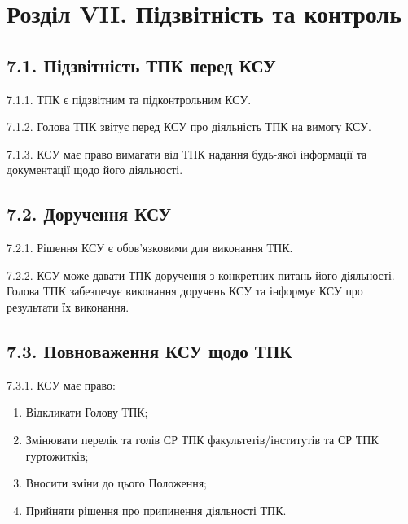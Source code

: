 \section*{Розділ VII. Підзвітність та контроль}

\subsection*{7.1. Підзвітність ТПК перед КСУ}
    7.1.1. ТПК є підзвітним та підконтрольним КСУ.

    7.1.2. Голова ТПК звітує перед КСУ про діяльність ТПК на вимогу КСУ.

    7.1.3. КСУ має право вимагати від ТПК надання будь-якої інформації та документації щодо його діяльності.

\subsection*{7.2. Доручення КСУ}
    7.2.1. Рішення КСУ є обов'язковими для виконання ТПК.

    7.2.2. КСУ може давати ТПК доручення з конкретних питань його діяльності. Голова ТПК забезпечує виконання доручень КСУ та інформує КСУ про результати їх виконання.

\subsection*{7.3. Повноваження КСУ щодо ТПК}
    7.3.1. КСУ має право:

        \begin{enumerate}[label=\alph*)]
            \item Відкликати Голову ТПК;
            \item Змінювати перелік та голів СР ТПК факультетів/інститутів та СР ТПК гуртожитків;
            \item Вносити зміни до цього Положення;
            \item Прийняти рішення про припинення діяльності ТПК.
        \end{enumerate}
